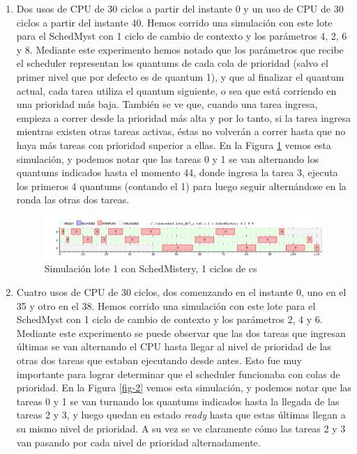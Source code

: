 \begin{enumerate}
\item Dos usos de CPU de 30 ciclos a partir del instante 0 y un uso de CPU de 30 ciclos a partir del instante 40.  Hemos corrido una simulación con este lote para el SchedMyst con 1 ciclo de cambio de contexto y los parámetros 4, 2, 6 y 8. Mediante este experimento hemos notado que los parámetros que recibe el scheduler representan los quantums de cada cola de prioridad (salvo el primer nivel que por defecto es de quantum 1), y que al finalizar el quantum actual, cada tarea utiliza el quantum siguiente, o sea que está corriendo en una prioridad más baja.  También se ve que, cuando una tarea ingresa, empieza a correr desde la prioridad más alta y por lo tanto, si la tarea ingresa mientras existen otras tareas activas, éstas no volverán a correr hasta que no haya más tareas con prioridad superior a ellas. En la Figura \ref{fig-1} vemos esta simulación, y podemos notar que las tareas 0 y 1 se van alternando los quantums indicados hasta el momento 44, donde ingresa la tarea 3, ejecuta los primeros 4 quantums (contando el 1) para luego seguir alternándose en la ronda las otras dos tareas.

\begin{figure}[!htb]
\begin{center}
  \includegraphics[scale=0.45]{imagenes/ej7-1.png}
\end{center}
\caption{Simulación lote 1 con SchedMistery, 1 ciclos de cs}\label{fig-1}
\end{figure}

\item Cuatro usos de CPU de 30 ciclos, dos comenzando en el instante 0, uno en el 35 y otro en el 38. Hemos corrido una simulación con este lote para el SchedMyst con 1 ciclo de cambio de contexto y los parámetros 2, 4 y 6. Mediante este experimento se puede observar que las dos tareas que ingresan últimas se van alternando el CPU hasta llegar al nivel de prioridad de las otras dos tareas que estaban ejecutando desde antes.  Esto fue muy importante para lograr determinar que el scheduler funcionaba con colas de prioridad. En la Figura \ref{fig-2} vemos esta simulación, y podemos notar que las tareas 0 y 1 se van turnando los quantums indicados hasta la llegada de las tareas 2 y 3, y luego quedan en estado {\it ready} hasta que estas últimas llegan a su mismo nivel de prioridad. A su vez se ve claramente cómo las tareas 2 y 3 van pasando por cada nivel de prioridad alternadamente.


\end{enumerate}
